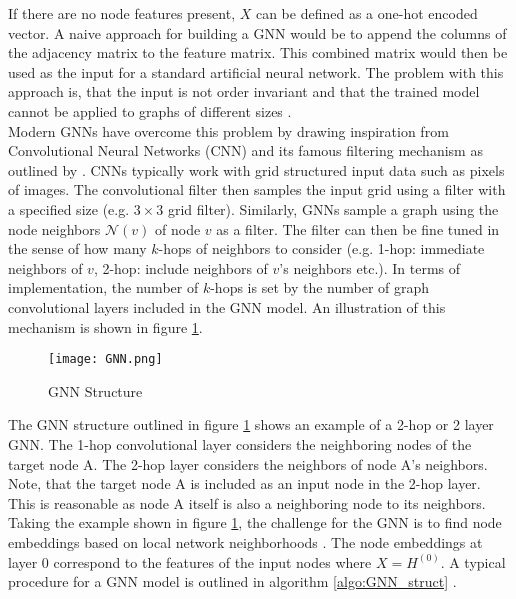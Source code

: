 	\noindent If there are no node features present, $X$ can be defined as a 
	one-hot encoded vector. A naive approach for building a GNN would be to
	append the columns of the adjacency matrix to the feature matrix. This
	combined matrix would then be used as the input for a standard
	artificial neural network. The problem with this approach is, that the 
	input is not order invariant and that the trained model cannot be applied 
	to graphs of different sizes \citep{leskovec2021lecture}. \\

	\noindent Modern GNNs have overcome this problem by drawing inspiration from 
	Convolutional Neural Networks (CNN) and its famous filtering mechanism as 
	outlined by \cite{krizhevsky2012imagenet}. CNNs typically work with grid 
	structured input data such as pixels of images. The convolutional filter 
	then samples the input grid using a filter with a specified size 
	(e.g. $3\times3$ grid filter). Similarly, GNNs sample a graph using the node 
	neighbors $\mathcal{N}(v)$ of node $v$ as a filter. The filter can then be 
	fine tuned in the sense of how many $k$-hops of neighbors to consider 
	(e.g. 1-hop: immediate neighbors of $v$, 2-hop: include neighbors of $v$'s 
	neighbors etc.). In terms of implementation, the number of $k$-hops is set 
	by the number of graph convolutional layers included in the GNN model. An 
	illustration of this mechanism is shown in figure \ref{fig:GNN_structure}. \\

	\begin{figure}[h]
		\centering
		\texttt{[image: GNN.png]}
		\caption{GNN Structure}
		\cite{leskovec2021lecture}
		\label{fig:GNN_structure}
	\end{figure}

	\noindent The GNN structure outlined in figure \ref{fig:GNN_structure} 
	shows an example of a 2-hop or 2 layer GNN. The 1-hop convolutional layer 
	considers the neighboring nodes of the target node A. The 2-hop layer 
	considers the neighbors of node A's neighbors. Note, that the target node A 
	is included as an input node in the 2-hop layer. This is reasonable as node 
	A itself is also a neighboring node to its neighbors. Taking the example 
	shown in figure \ref{fig:GNN_structure}, the challenge for the GNN is to 
	find node embeddings based on local network neighborhoods \citep{leskovec2021lecture}. 
	The node embeddings at layer 0 correspond to the features of the input nodes 
	where $X = H^{(0)}$. A typical procedure for a GNN model is outlined in 
	algorithm \ref{algo:GNN_struct} 
	\citep{hamilton2017inductive,leskovec2021lecture,you2020design}.	

